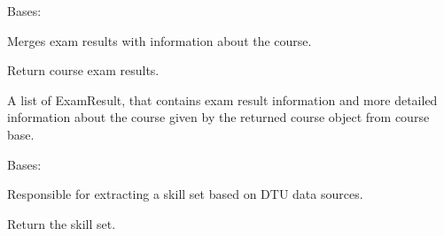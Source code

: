 \documentclass[letterpaper,10pt,english]{sphinxmanual}
\begin{document}
\begin{fulllineitems}
\label{cv_kickstarter:cv_kickstarter.dtu_skill_set.CampusNetCourseBaseMerger}
Bases: 

Merges exam results with information about the course.

\begin{fulllineitems}
\label{cv_kickstarter:cv_kickstarter.dtu_skill_set.CampusNetCourseBaseMerger.course_exam_results}
Return course exam results.

A list of ExamResult, that contains exam result information and
more detailed information about the course given by the returned
course object from course base.

\end{fulllineitems}


\end{fulllineitems}


\begin{fulllineitems}
\label{cv_kickstarter:cv_kickstarter.dtu_skill_set.DtuSkillSet}
Bases: 

Responsible for extracting a skill set based on DTU data sources.

\begin{fulllineitems}
\label{cv_kickstarter:cv_kickstarter.dtu_skill_set.DtuSkillSet.skill_set}
Return the skill set.

\end{fulllineitems}


\end{fulllineitems}

\end{document}
